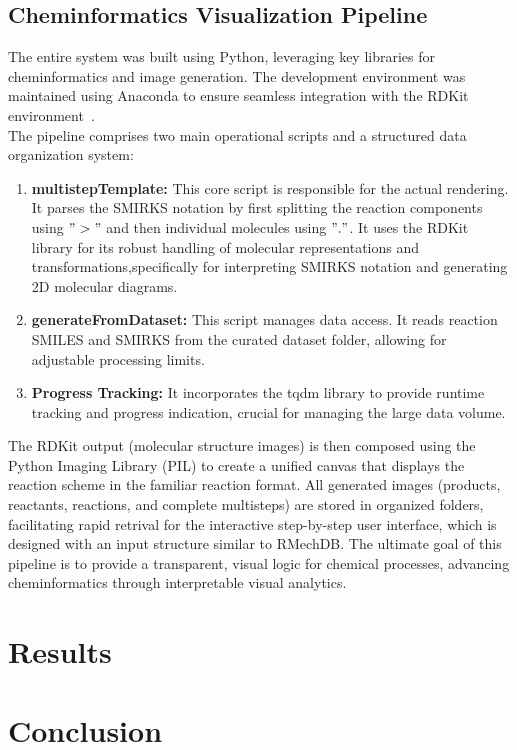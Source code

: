 \documentclass[12pt]{article}
\begin{document}
\subsection{Cheminformatics Visualization Pipeline}
The entire system was built using Python, leveraging key libraries for cheminformatics and image generation.
The development environment was maintained using Anaconda to ensure seamless integration with the RDKit environment~\cite{rdkit2025overview}.
\\
The pipeline comprises two main operational scripts and a structured data organization system:
\begin{enumerate}
    \item \textbf{multistepTemplate:} This core script is responsible for the actual rendering. It parses the SMIRKS notation by first splitting the reaction components using $">"$ and then individual molecules using $"."$. It uses the RDKit library for its robust handling of molecular representations and transformations,specifically for interpreting SMIRKS notation and generating 2D molecular diagrams.
    \item \textbf{generateFromDataset:} This script manages data access. It reads reaction SMILES and SMIRKS from the curated dataset folder, allowing for adjustable processing limits.
    \item \textbf{Progress Tracking:} It incorporates the tqdm library to provide runtime tracking and progress indication, crucial for managing the large data volume.
\end{enumerate}
The RDKit output (molecular structure images) is then composed using the Python Imaging Library (PIL) to create a unified canvas that displays the reaction scheme in the familiar reaction format.
All generated images (products, reactants, reactions, and complete multisteps) are stored in organized folders, facilitating rapid retrival for the interactive step-by-step user interface, which is designed with an input structure similar to RMechDB.
The ultimate goal of this pipeline is to provide a transparent, visual logic for chemical processes, advancing cheminformatics through interpretable visual analytics.



\section{Results}

\section{Conclusion}



\end{document}
